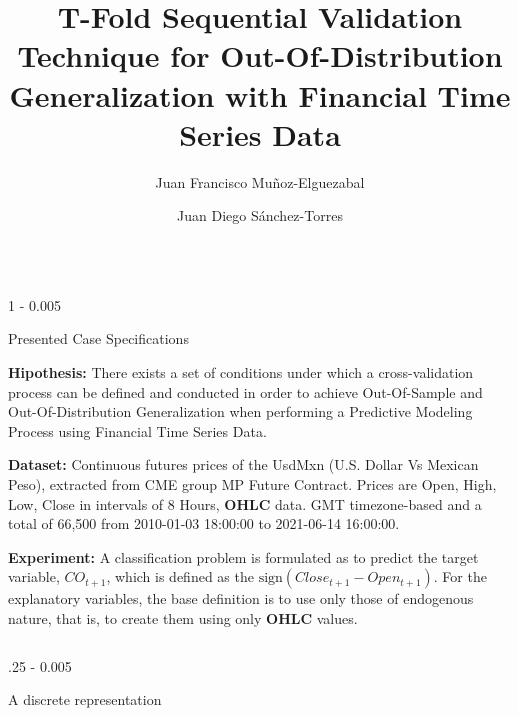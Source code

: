 \documentclass{postertheme}\usepackage[]{graphicx}\usepackage[]{color}
\title{T-Fold Sequential Validation Technique for Out-Of-Distribution Generalization with Financial
       Time Series Data}
\author {Juan Francisco Muñoz-Elguezabal \inst{1} \and Juan Diego Sánchez-Torres \inst{1}}
\institute {\inst{1} Mathematics \& Physics Department - 
Western Institute of Technology and Higher Education (ITESO)}
\begin{document}
\begin{frame}


\begin{columns}[onlytextwidth]
  
  \begin{column}{1 \textwidth - 0.005 \textwidth}
    \begin{block}{Presented Case Specifications} \footnotesize

    \textbf{Hipothesis:}
      There exists a set of conditions under which a cross-validation process can be defined and conducted in
      order to achieve Out-Of-Sample and Out-Of-Distribution Generalization when performing a Predictive
      Modeling Process using Financial Time Series Data.
      
    \textbf{Dataset:}
      Continuous futures prices of the UsdMxn (U.S. Dollar Vs Mexican Peso),
      extracted from CME group MP Future Contract. Prices are Open, High, Low, Close
      in intervals of 8 Hours, \textbf{OHLC} data. GMT timezone-based and a total of 66,500 
      from 2010-01-03 18:00:00 to 2021-06-14 16:00:00.
    
    \textbf{Experiment:}
      A classification problem is formulated as to predict the target variable, $CO_{t+1}$, which is defined
      as the $\text{sign}(Close_{t+1} - Open_{t+1})$. For the explanatory variables, the base definition is to
      use only those of endogenous nature, that is, to create them using only \textbf{OHLC} values.
  
    \end{block}
  \end{column}
\end{columns}


\begin{columns}[onlytextwidth]
  
  \begin{column}{.25 \textwidth - 0.005 \textwidth}
    \begin{block}{A discrete representation} \footnotesize
    

\end{block}
\end{column}
\end{columns}
\end{frame}
\end{document}
